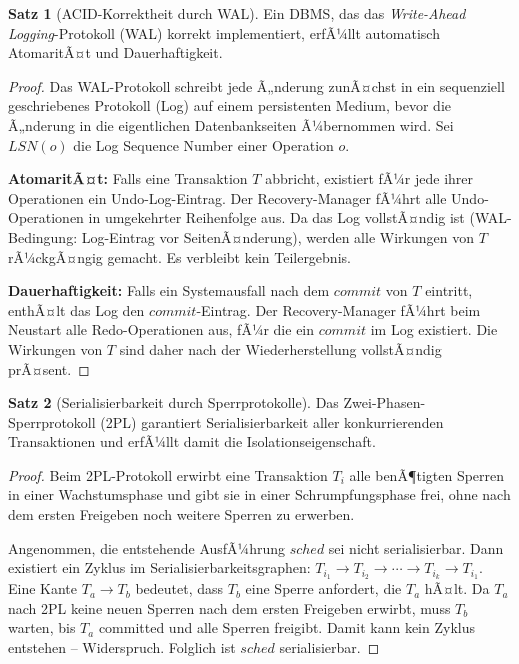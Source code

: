 ﻿\documentclass[a4paper,12pt]{article}
\theoremstyle{definition}
\newtheorem{satz}{Satz}
\begin{document}
\begin{satz}[ACID-Korrektheit durch WAL]
\label{satz:wal}
Ein DBMS, das das \emph{Write-Ahead Logging}-Protokoll (WAL) korrekt implementiert, erfÃ¼llt automatisch AtomaritÃ¤t und Dauerhaftigkeit.
\end{satz}

\begin{proof}
Das WAL-Protokoll schreibt jede Ã„nderung zunÃ¤chst in ein sequenziell geschriebenes Protokoll (Log) auf einem persistenten Medium, bevor die Ã„nderung in die eigentlichen Datenbankseiten Ã¼bernommen wird. Sei $\mathit{LSN}(o)$ die Log Sequence Number einer Operation $o$.

\textbf{AtomaritÃ¤t:} Falls eine Transaktion $T$ abbricht, existiert fÃ¼r jede ihrer Operationen ein Undo-Log-Eintrag. Der Recovery-Manager fÃ¼hrt alle Undo-Operationen in umgekehrter Reihenfolge aus. Da das Log vollstÃ¤ndig ist (WAL-Bedingung: Log-Eintrag vor SeitenÃ¤nderung), werden alle Wirkungen von $T$ rÃ¼ckgÃ¤ngig gemacht. Es verbleibt kein Teilergebnis.

\textbf{Dauerhaftigkeit:} Falls ein Systemausfall nach dem $\mathit{commit}$ von $T$ eintritt, enthÃ¤lt das Log den $\mathit{commit}$-Eintrag. Der Recovery-Manager fÃ¼hrt beim Neustart alle Redo-Operationen aus, fÃ¼r die ein $\mathit{commit}$ im Log existiert. Die Wirkungen von $T$ sind daher nach der Wiederherstellung vollstÃ¤ndig prÃ¤sent.
\end{proof}

\begin{satz}[Serialisierbarkeit durch Sperrprotokolle]
\label{satz:serialisierbarkeit}
Das Zwei-Phasen-Sperrprotokoll (2PL) garantiert Serialisierbarkeit aller konkurrierenden Transaktionen und erfÃ¼llt damit die Isolationseigenschaft.
\end{satz}

\begin{proof}
Beim 2PL-Protokoll erwirbt eine Transaktion $T_i$ alle benÃ¶tigten Sperren in einer Wachstumsphase und gibt sie in einer Schrumpfungsphase frei, ohne nach dem ersten Freigeben noch weitere Sperren zu erwerben.

Angenommen, die entstehende AusfÃ¼hrung $\mathit{sched}$ sei nicht serialisierbar. Dann existiert ein Zyklus im Serialisierbarkeitsgraphen: $T_{i_1} \to T_{i_2} \to \cdots \to T_{i_k} \to T_{i_1}$. Eine Kante $T_a \to T_b$ bedeutet, dass $T_b$ eine Sperre anfordert, die $T_a$ hÃ¤lt. Da $T_a$ nach 2PL keine neuen Sperren nach dem ersten Freigeben erwirbt, muss $T_b$ warten, bis $T_a$ committed und alle Sperren freigibt. Damit kann kein Zyklus entstehen -- Widerspruch. Folglich ist $\mathit{sched}$ serialisierbar.
\end{proof}
\end{document}
